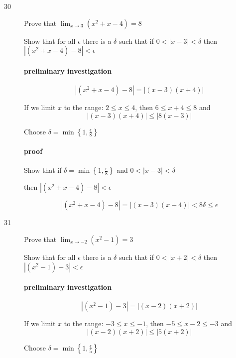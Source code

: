 \documentclass[letterpaper, landscape]{exam}
\begin{document}
\begin{description}
      \item[30] Prove that $\lim_{x \to 3} \left( x^2 + x - 4 \right) = 8$

        Show that for all $\epsilon$ there is a $\delta$ such that if 
        $0 < |x - 3| < \delta$ then $\left| \left( x^2 + x - 4 \right) - 8 \right| < \epsilon$

        \paragraph{preliminary investigation}

        \[
          \left| \left( x^2 + x - 4 \right) - 8 \right| = |(x - 3)(x + 4)| 
        \]

        If we limit $x$ to the range: $2 \leq x \leq 4$, then $6 \leq x + 4 \leq 8$ and
        \[
          |(x - 3)(x + 4)| \leq |8 (x - 3)|
        \]

        Choose $\delta = \min \left\{1, \frac{\epsilon}{8} \right\}$

        \paragraph{proof}
        Show that if $\delta = \min \left\{ 1, \frac{\epsilon}{8} \right\}$ and 
        $0 < |x - 3| < \delta$ 
        
        then $\left| \left( x^2 + x - 4 \right) - 8 \right| < \epsilon$

        \[
          \left| \left( x^2 + x - 4 \right) - 8 \right| = |(x - 3)(x + 4)| < 8 \delta \leq \epsilon
        \]

      \item[31] Prove that $\lim_{x \to -2} \left( x^2 - 1 \right) = 3$

        Show that for all $\epsilon$ there is a $\delta$ such that if 
        $0 < |x + 2| < \delta$ then $| \left( x^2 - 1 \right) - 3 | < \epsilon$

        \paragraph{preliminary investigation}

        \[
          | \left( x^2 - 1 \right) - 3 | = |(x - 2)(x + 2)| 
        \]

        If we limit $x$ to the range: $-3 \leq x \leq -1$, then $-5 \leq x - 2 \leq -3$ and
        \[
          |(x - 2)(x + 2)| \leq |5 (x + 2)|
        \]

        Choose $\delta = \min \left\{1, \frac{\epsilon}{5} \right\}$


\end{description}
\end{document}
